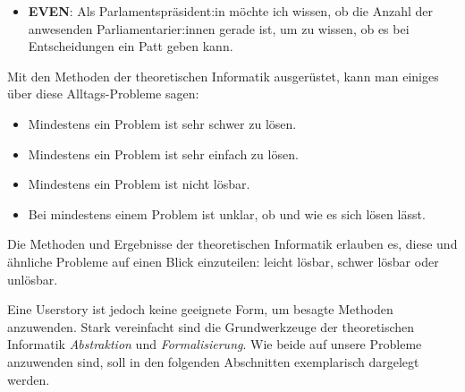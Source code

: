 \begin{itemize}
    \item \textbf{EVEN}: Als Parlamentspräsident:in möchte ich wissen,
         ob die Anzahl der anwesenden Parliamentarier:innen gerade ist,
         um zu wissen, ob es bei Entscheidungen ein Patt geben kann.
\end{itemize}

Mit den Methoden der theoretischen Informatik ausgerüstet,
kann man einiges über diese Alltags-Probleme sagen:
\begin{itemize}
    \item Mindestens ein Problem ist sehr schwer zu lösen.
    \item Mindestens ein Problem ist sehr einfach zu lösen.
    \item Mindestens ein Problem ist nicht lösbar.
    \item Bei mindestens einem Problem ist unklar, ob und wie es sich lösen lässt.
\end{itemize}

Die Methoden und Ergebnisse der theoretischen Informatik erlauben es,
diese und ähnliche Probleme auf einen Blick einzuteilen:
leicht lösbar, schwer lösbar oder unlösbar.

Eine Userstory ist jedoch keine geeignete Form,
um besagte Methoden anzuwenden.
Stark vereinfacht sind die Grundwerkzeuge der theoretischen Informatik
\emph{Abstraktion} und \emph{Formalisierung}.
Wie beide auf unsere Probleme anzuwenden sind,
soll in den folgenden Abschnitten exemplarisch dargelegt werden.

